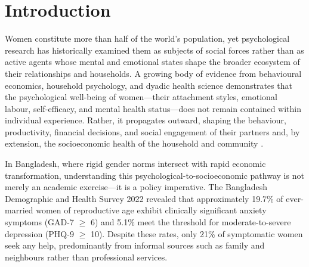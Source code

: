 \documentclass[12pt, a4paper]{article}
\begin{document}
\begin{abstract}
\textbf{Conclusions:} Women's mental health functions as a household-level economic variable, not merely a personal health concern. Gender egalitarianism serves as a systemic protective buffer. Interventions targeting women's mental health should incorporate male partner metrics and household economic outcomes to fully capture programme impact.

\medskip
\noindent\textbf{Keywords:} women's mental health; dyadic transmission; structural equation modelling; socioeconomic outcomes; Bangladesh; gender norms; moderated mediation; machine learning
\end{abstract}

\newpage
\setcounter{page}{1}
\tableofcontents
\newpage

\section{Introduction}

Women constitute more than half of the world's population, yet psychological research has historically examined them as subjects of social forces rather than as active agents whose mental and emotional states shape the broader ecosystem of their relationships and households. A growing body of evidence from behavioural economics, household psychology, and dyadic health science demonstrates that the psychological well-being of women—their attachment styles, emotional labour, self-efficacy, and mental health status—does not remain contained within individual experience. Rather, it propagates outward, shaping the behaviour, productivity, financial decisions, and social engagement of their partners and, by extension, the socioeconomic health of the household and community \citep{kiecolt2001, saxbe2010}.

In Bangladesh, where rigid gender norms intersect with rapid economic transformation, understanding this psychological-to-socioeconomic pathway is not merely an academic exercise—it is a policy imperative. The Bangladesh Demographic and Health Survey 2022 \citep[BDHS 2022;][]{niport2023} revealed that approximately 19.7\% of ever-married women of reproductive age exhibit clinically significant anxiety symptoms (GAD-7 $\geq$ 6) and 5.1\% meet the threshold for moderate-to-severe depression (PHQ-9 $\geq$ 10). Despite these rates, only 21\% of symptomatic women seek any help, predominantly from informal sources such as family and neighbours rather than professional services.
\end{document}
